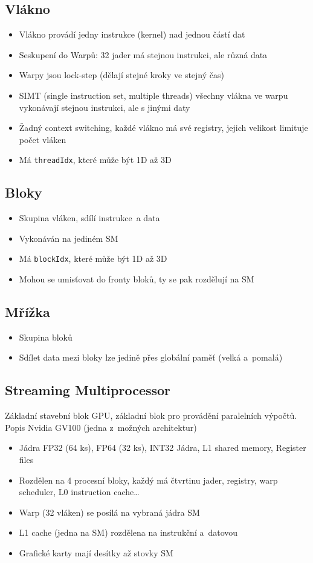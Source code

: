 \subsection{Vlákno}
\begin{itemize}
    \item Vlákno provádí jedny instrukce (kernel) nad jednou částí dat
    \item Seskupení do Warpů: 32 jader má stejnou instrukci, ale různá data
    \item Warpy jsou lock-step (dělají stejné kroky ve stejný čas)
    \item SIMT (single instruction set, multiple threads) všechny vlákna ve warpu vykonávají stejnou instrukci, ale s jinými daty
    \item Žadný context switching, každé vlákno má své registry, jejich velikost limituje počet vláken
    \item Má \texttt{threadIdx}, které může být 1D až 3D
\end{itemize}

\subsection{Bloky}
\begin{itemize}
    \item Skupina vláken, sdílí instrukce~a data
    \item Vykonáván na jediném SM
    \item Má \texttt{blockIdx}, které může být 1D až 3D
    \item Mohou se umisťovat do fronty bloků, ty se pak rozdělují na SM
\end{itemize}

\subsection{Mřížka}
\begin{itemize}
    \item Skupina bloků
    \item Sdílet data mezi bloky lze jedině přes globální paměť (velká a~pomalá)
\end{itemize}

\subsection{Streaming Multiprocessor}
Základní stavební blok GPU, základní blok pro provádění paralelních výpočtů. 
Popis Nvidia GV100 (jedna z~možných architektur)
\begin{itemize}
    \item Jádra FP32 (64 ks), FP64 (32 ks), INT32 Jádra, L1 shared memory, Register files
    \item Rozdělen na 4 procesní bloky, každý má čtvrtinu jader, registry, warp scheduler, L0 instruction cache\dots
    \item Warp (32 vláken) se posílá na vybraná jádra SM
    \item L1 cache (jedna na SM) rozdělena na instrukční a~datovou
    \item Grafické karty mají desítky až stovky SM
\end{itemize}

